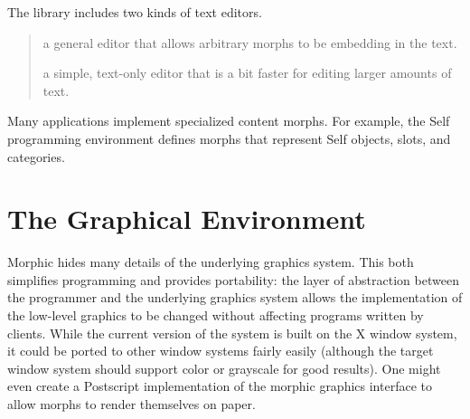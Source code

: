 \documentclass[letterpaper,10pt,english]{sphinxmanual}
\begin{document}
The library includes two kinds of text editors.
\begin{quote}

 a general editor that allows arbitrary morphs to be embedding in the text.

 a simple, text-only editor that is a bit faster for editing larger amounts of text.
\end{quote}

Many applications implement specialized content morphs. For example, the Self programming environment defines morphs that represent Self objects, slots, and categories.


\section{The Graphical Environment}
\label{\detokenize{morphic:the-graphical-environment}}
Morphic hides many details of the underlying graphics system. This both simplifies programming and provides portability: the layer of abstraction between the programmer and the underlying graphics system allows the implementation of the low-level graphics to be changed without affecting programs written by clients. While the current version of the system is built on the X window system, it could be ported to other window systems fairly easily (although the target window system should support color or grayscale for good results). One might even create a Postscript implementation of the morphic graphics interface to allow morphs to render themselves on paper.
\end{document}
